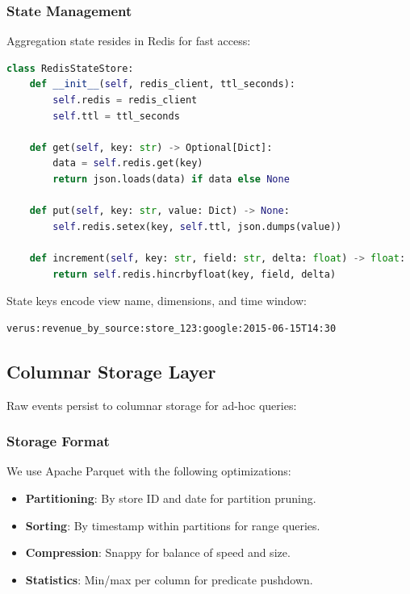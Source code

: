 \documentclass[11pt,twocolumn]{article}
\begin{document}
\subsubsection{State Management}

Aggregation state resides in Redis for fast access:

\begin{lstlisting}[language=Python,caption=Redis state store]
class RedisStateStore:
    def __init__(self, redis_client, ttl_seconds):
        self.redis = redis_client
        self.ttl = ttl_seconds

    def get(self, key: str) -> Optional[Dict]:
        data = self.redis.get(key)
        return json.loads(data) if data else None

    def put(self, key: str, value: Dict) -> None:
        self.redis.setex(key, self.ttl, json.dumps(value))

    def increment(self, key: str, field: str, delta: float) -> float:
        return self.redis.hincrbyfloat(key, field, delta)
\end{lstlisting}

State keys encode view name, dimensions, and time window:

\begin{verbatim}
verus:revenue_by_source:store_123:google:2015-06-15T14:30
\end{verbatim}

\subsection{Columnar Storage Layer}

Raw events persist to columnar storage for ad-hoc queries:

\subsubsection{Storage Format}

We use Apache Parquet with the following optimizations:

\begin{itemize}
\item \textbf{Partitioning}: By store ID and date for partition pruning.
\item \textbf{Sorting}: By timestamp within partitions for range queries.
\item \textbf{Compression}: Snappy for balance of speed and size.
\item \textbf{Statistics}: Min/max per column for predicate pushdown.
\end{itemize}
\end{document}
